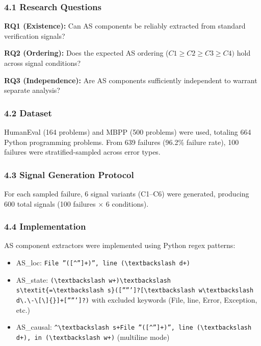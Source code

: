 
\subsubsection{4.1 Research Questions}

\textbf{RQ1 (Existence):} Can AS components be reliably extracted from standard verification signals?

\textbf{RQ2 (Ordering):} Does the expected AS ordering ($C1\geq C2\geq C3\geq C4)$ hold across signal conditions?

\textbf{RQ3 (Independence):} Are AS components sufficiently independent to warrant separate analysis?

\subsubsection{4.2 Dataset}

HumanEval (164 problems) and MBPP (500 problems) were used, totaling 664 Python programming problems. From 639 failures (96.2\% failure rate), 100 failures were stratified-sampled across error types.

\subsubsection{4.3 Signal Generation Protocol}

For each sampled failure, 6 signal variants (C1--C6) were generated, producing 600 total signals (100 failures $\times$ 6 conditions).

\subsubsection{4.4 Implementation}

AS component extractors were implemented using Python regex patterns:

\begin{itemize}
\item AS\_loc: \texttt{File ''([\^{}'']+)'', line (\textbackslash textbackslash d+)}
\item AS\_state: \texttt{(\textbackslash textbackslash w+)\textbackslash textbackslash s\textbackslash textit\{=\textbackslash textbackslash s\}([''''']?[\textbackslash textbackslash w\textbackslash textbackslash d\textbackslash .\textbackslash -\textbackslash [\textbackslash ]\{\}]+[''''']?)} with excluded keywords (File, line, Error, Exception, etc.)
\item AS\_causal: \texttt{\^{}\textbackslash textbackslash s+File ''([\^{}'']+)'', line (\textbackslash textbackslash d+), in (\textbackslash textbackslash w+)} (multiline mode)
\end{itemize}


